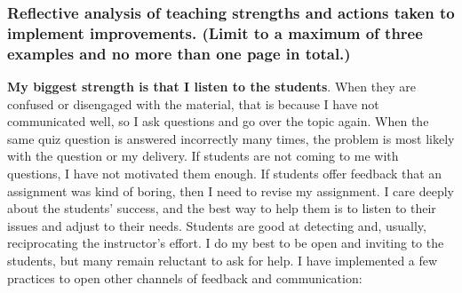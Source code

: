 \documentclass[10pt]{article}
\newcommand\D{\hangindent1.25cm}
\begin{document}
\subsubsection{Reflective analysis of teaching strengths and actions taken to implement improvements. (Limit to a maximum of three examples and no more than one page in total.)}

\newlength{\innerparindent}
\setlength{\innerparindent}{2.1cm}

\renewcommand\D{
    \hangindent\innerparindent
    \setlength{\parskip}{1em}
    \setlength{\parindent}{\innerparindent}
    }


\D \textbf{My biggest strength is that I listen to the students}. When they are confused or disengaged with the material, that is because I have not communicated well, so I ask questions and go over the topic again. When the same quiz question is answered incorrectly many times, the problem is most likely with the question or my delivery. If students are not coming to me with questions, I have not motivated them enough. If students offer feedback that an assignment was kind of boring, then I need to revise my assignment. I care deeply about the students' success, and the best way to help them is to listen to their issues and adjust to their needs. Students are good at detecting and, usually, reciprocating the instructor's effort. I do my best to be open and inviting to the students, but many remain reluctant to ask for help. I have implemented a few practices to open other channels of feedback and communication:
\end{document}
